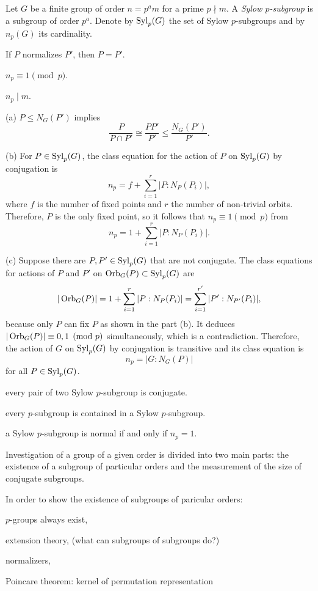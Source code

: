 \documentclass{../../large}
\begin{document}
\begin{prb}
Let $G$ be a finite group of order $n=p^am$ for a prime $p\nmid m$.
A \emph{Sylow $p$-subgroup} is a subgroup of order $p^a$.
Denote by $\operatorname{Syl}_p(G)$ the set of Sylow $p$-subgroups and by $n_p(G)$ its cardinality.
\begin{parts}
\item If $P$ normalizes $P'$, then $P=P'$.
\item $n_p\equiv1\pmod p$.
\item $n_p\mid m$.
\end{parts}
\end{prb}
\begin{pf}
(a)
$P\le N_G(P')$ implies
\[\frac P{P\cap P'}\cong\frac{PP'}{P'}\le\frac{N_G(P')}{P'}.\]


(b)
For $P\in\operatorname{Syl}_p(G)$, the class equation for the action of $P$ on $\operatorname{Syl}_p(G)$ by conjugation is
\[n_p=f+\sum_{i=1}^r|P:N_P(P_i)|,\]
where $f$ is the number of fixed points and $r$ the number of non-trivial orbits.
Therefore, $P$ is the only fixed point, so it follows that $n_p\equiv1\pmod p$ from
\[n_p=1+\sum_{i=1}^r|P:N_P(P_i)|.\]

(c)
Suppose there are $P,P'\in\operatorname{Syl}_p(G)$ that are not conjugate.
The class equations for actions of $P$ and $P'$ on $\operatorname{Orb}_G(P)\subset\operatorname{Syl}_p(G)$ are
\[|\operatorname{Orb}_G(P)|=1+\sum_{i=1}^r|P:N_P(P_i)|=\sum_{i=1}^{r'}|P':N_{P'}(P_i)|,\]
because only $P$ can fix $P$ as shown in the part (b).
It deduces $|\operatorname{Orb}_G(P)|\equiv0,1\pmod{p}$ simultaneously, which is a contradiction.
Therefore, the action of $G$ on $\operatorname{Syl}_p(G)$ by conjugation is transitive and its class equation is
\[n_p=|G:N_G(P)|\]
for all $P\in\operatorname{Syl}_p(G)$.
\end{pf}

\begin{parts}
\item every pair of two Sylow $p$-subgroup is conjugate.
\item every $p$-subgroup is contained in a Sylow $p$-subgroup.
\item a Sylow $p$-subgroup is normal if and only if $n_p=1$.
\end{parts}

Investigation of a group of a given order is divided into two main parts: the existence of a subgroup of particular orders and the measurement of the size of conjugate subgroups.

In order to show the existence of subgroups of paricular orders:
\begin{parts}
\item $p$-groups always exist,
\item extension theory, (what can subgroups of subgroups do?)
\item normalizers,
\item Poincare theorem: kernel of permutation representation
\end{parts}
\end{document}
